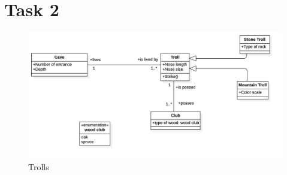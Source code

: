 \chapter{Task 2}
\begin{figure}[hbt]
	\label{Trolls}
  \includegraphics[width=1.4\textwidth]{Immagini/trolls.png}
  \caption{Trolls}
\end{figure}

    